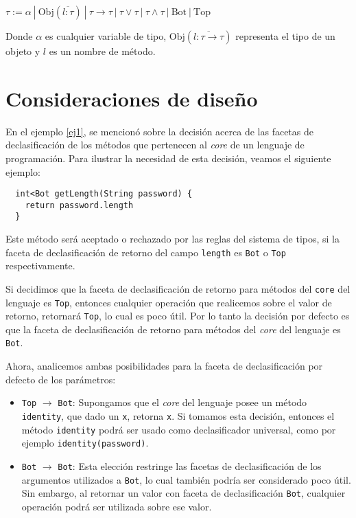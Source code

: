 \begin{defn}
  \normalfont
  $\tau := \alpha\ |\ \text{Obj}(\overline{l: \tau})\ |\ \tau \rightarrow \tau \ |\ \tau \vee \tau\ |\ \tau \wedge \tau \ |\ \text{Bot}\ |\ \text{Top}$
\end{defn}

Donde $\alpha$ es cualquier variable de tipo, $\text{Obj}(\overline{l: \tau \rightarrow \tau})$ representa el tipo de un objeto y $l$ es un nombre de método.

\section{Consideraciones de diseño}

En el ejemplo \ref{ej1}, se mencionó sobre la decisión acerca de las facetas de declasificación de los métodos que pertenecen al \textit{core} de un lenguaje de programación. Para ilustrar la necesidad de esta decisión, veamos el siguiente ejemplo:

\begin{lstlisting}
  int<Bot getLength(String password) {
    return password.length
  }
\end{lstlisting}

Este método será aceptado o rechazado por las reglas del sistema de tipos, si la faceta de declasificación de retorno del campo \texttt{length} es \texttt{Bot} o \texttt{Top} respectivamente.

Si decidimos que la faceta de declasificación de retorno para métodos del \texttt{core} del lenguaje es \texttt{Top}, entonces cualquier operación que realicemos sobre el valor de retorno, retornará \texttt{Top}, lo cual es poco útil. Por lo tanto la decisión por defecto es que la faceta de declasificación de retorno para métodos del \textit{core} del lenguaje es \texttt{Bot}.

Ahora, analicemos ambas posibilidades para la faceta de declasificación por defecto de los parámetros:

\begin{itemize}
  \item \texttt{Top} $\rightarrow$ \texttt{Bot}: Supongamos que el \textit{core} del lenguaje posee un método \texttt{identity}, que dado un \texttt{x}, retorna \texttt{x}. Si tomamos esta decisión, entonces el método \texttt{identity} podrá ser usado como declasificador universal, como por ejemplo \texttt{identity(password)}.
  \item \texttt{Bot} $\rightarrow$ \texttt{Bot}: Esta elección restringe las facetas de declasificación de los argumentos utilizados a \texttt{Bot}, lo cual también podría ser considerado poco útil. Sin embargo, al retornar un valor con faceta de declasificación \texttt{Bot}, cualquier operación podrá ser utilizada sobre ese valor.
\end{itemize}

